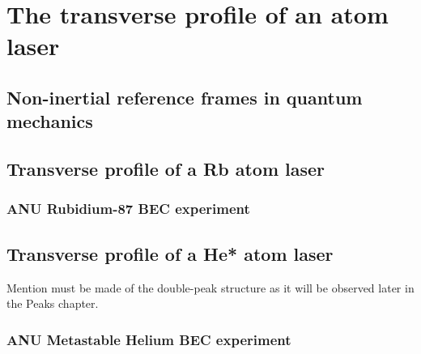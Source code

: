 \chapter{The transverse profile of an atom laser}
\label{TransverseProfile}
\graphicspath{{Figures/TransverseProfile/}{Figures/Common/}}

\section{Non-inertial reference frames in quantum mechanics}
\label{TransverseProfile:DropGP}

\section{Transverse profile of a Rb atom laser}
\label{TransverseProfile:Rubidium}

\subsection{ANU Rubidium-87 BEC experiment}
\label{TransverseProfile:RbExperiment}

\section{Transverse profile of a He* atom laser}
\label{TransverseProfile:Helium}

Mention must be made of the double-peak structure as it will be observed later in the Peaks chapter.

\subsection{ANU Metastable Helium BEC experiment}
\label{TransverseProfile:He*Experiment}